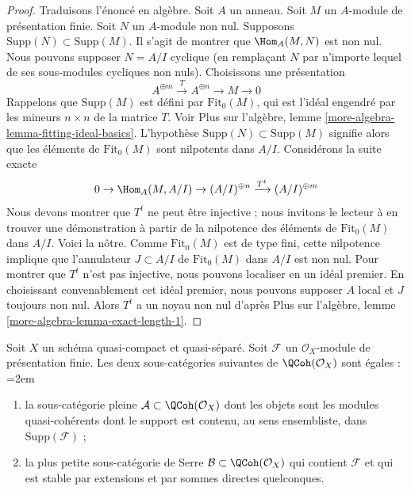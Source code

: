 \begin{proof}
Traduisons l'énoncé en algèbre. Soit $A$ un anneau. Soit $M$ un
$A$-module de présentation finie. Soit $N$ un $A$-module non nul. Supposons
$\text{Supp}(N) \subset \text{Supp}(M)$. Il s'agit de montrer que
$\Hom_A(M, N)$ est non nul.
Nous pouvons supposer $N = A/I$ cyclique (en remplaçant $N$ par n'importe
lequel de ses sous-modules cycliques non nuls). Choisissons une présentation
$$
A^{\oplus m} \xrightarrow{T} A^{\oplus n} \to M \to 0
$$
Rappelons que $\text{Supp}(M)$ est défini par $\text{Fit}_0(M)$, qui est
l'idéal engendré par les mineurs $n \times n$ de la matrice $T$.
Voir Plus sur l'algèbre, lemme
\ref{more-algebra-lemma-fitting-ideal-basics}.
L'hypothèse $\text{Supp}(N) \subset \text{Supp}(M)$ signifie alors que
les éléments de $\text{Fit}_0(M)$ sont nilpotents dans $A/I$.
Considérons la suite exacte
$$
0 \to \Hom_A(M, A/I) \to (A/I)^{\oplus n} \xrightarrow{T^t} (A/I)^{\oplus m}
$$
Nous devons montrer que $T^t$ ne peut être injective ; nous invitons le
lecteur à en trouver une démonstration à partir de la nilpotence des éléments
de $\text{Fit}_0(M)$ dans $A/I$. Voici la nôtre.
Comme $\text{Fit}_0(M)$ est de type fini, cette nilpotence implique que
l'annulateur $J \subset A/I$ de $\text{Fit}_0(M)$ dans $A/I$ est non nul.
Pour montrer que $T^t$ n'est pas injective, nous pouvons localiser en un idéal
premier. En choisissant convenablement cet idéal premier, nous pouvons
supposer $A$ local et $J$ toujours non nul. Alors $T^t$ a un noyau non nul
d'après Plus sur l'algèbre, lemme
\ref{more-algebra-lemma-exact-length-1}.
\end{proof}

\begin{lemma}
\label{lemma-supported-on-support}
Soit $X$ un schéma quasi-compact et quasi-séparé.
Soit $\mathcal{F}$ un $\mathcal{O}_X$-module de présentation finie.
Les deux sous-catégories suivantes de $\QCoh(\mathcal{O}_X)$ sont égales :
\begingroup\emergencystretch=2em
\begin{enumerate}
\item la sous-catégorie pleine $\mathcal{A} \subset \QCoh(\mathcal{O}_X)$
dont les objets sont les modules quasi-cohérents dont le support est contenu,
au sens ensembliste, dans $\text{Supp}(\mathcal{F})$ ;
\item la plus petite sous-catégorie de Serre
$\mathcal{B} \subset \QCoh(\mathcal{O}_X)$ qui contient
$\mathcal{F}$ et qui est stable par extensions et par sommes directes
quelconques.
\end{enumerate}
\endgroup
\end{lemma}

